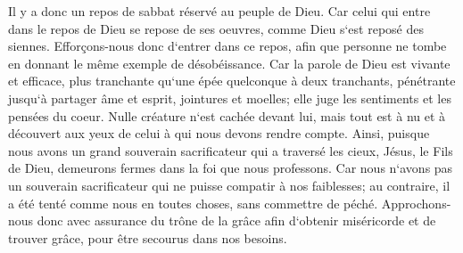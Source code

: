 \verse Il y a donc un repos de sabbat réservé au peuple de Dieu. 
\verse Car celui qui entre dans le repos de Dieu se repose de ses oeuvres, comme Dieu s`est reposé des siennes. 
\verse Efforçons-nous donc d`entrer dans ce repos, afin que personne ne tombe en donnant le même exemple de désobéissance. 
\verse Car la parole de Dieu est vivante et efficace, plus tranchante qu`une épée quelconque à deux tranchants, pénétrante jusqu`à partager âme et esprit, jointures et moelles; elle juge les sentiments et les pensées du coeur. 
\verse Nulle créature n`est cachée devant lui, mais tout est à nu et à découvert aux yeux de celui à qui nous devons rendre compte. 
\verse Ainsi, puisque nous avons un grand souverain sacrificateur qui a traversé les cieux, Jésus, le Fils de Dieu, demeurons fermes dans la foi que nous professons. 
\verse Car nous n`avons pas un souverain sacrificateur qui ne puisse compatir à nos faiblesses; au contraire, il a été tenté comme nous en toutes choses, sans commettre de péché. 
\verse Approchons-nous donc avec assurance du trône de la grâce afin d`obtenir miséricorde et de trouver grâce, pour être secourus dans nos besoins. 

